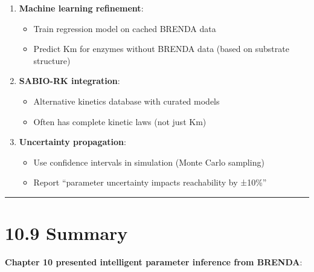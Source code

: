 \begin{enumerate}
\def\labelenumi{\arabic{enumi}.}
\tightlist
\item
  \textbf{Machine learning refinement}:

  \begin{itemize}
  \tightlist
  \item
    Train regression model on cached BRENDA data
  \item
    Predict Km for enzymes without BRENDA data (based on substrate
    structure)
  \end{itemize}
\item
  \textbf{SABIO-RK integration}:

  \begin{itemize}
  \tightlist
  \item
    Alternative kinetics database with curated models
  \item
    Often has complete kinetic laws (not just Km)
  \end{itemize}
\item
  \textbf{Uncertainty propagation}:

  \begin{itemize}
  \tightlist
  \item
    Use confidence intervals in simulation (Monte Carlo sampling)
  \item
    Report ``parameter uncertainty impacts reachability by ±10\%''
  \end{itemize}
\end{enumerate}

\begin{center}\rule{0.5\linewidth}{0.5pt}\end{center}

\hypertarget{summary}{%
\section{10.9 Summary}\label{summary}}

\textbf{Chapter 10 presented intelligent parameter inference from
BRENDA}:

